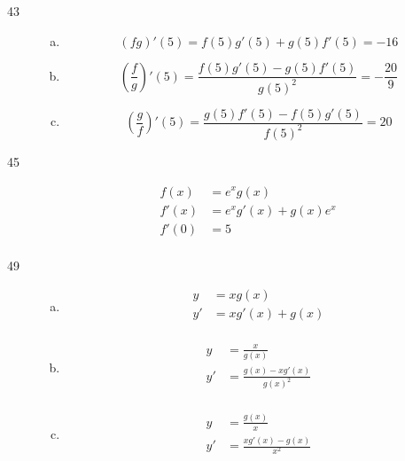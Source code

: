 \documentclass[letterpaper, landscape]{exam}
\begin{document}
\begin{description}
    \item[43]
      \begin{enumerate}[(a)]

        \item 
          \[
            (fg)'(5) = f(5)g'(5) + g(5)f'(5) = \boxed{ -16 }
          \]

        \item 
          \[
            (\frac{f}{g})'(5) = \frac{f(5)g'(5) - g(5)f'(5)}{g(5)^2} 
              = \boxed{ - \frac{20}{9} }
          \]

        \item 
          \[
            (\frac{g}{f})'(5) = \frac{g(5)f'(5) - f(5)g'(5)}{f(5)^2} = \boxed{ 20 }
          \]

      \end{enumerate}

    \item[45]
      \begin{align*}
        f(x)  & = e^x g(x) \\
        f'(x) & = e^x g'(x) + g(x) e^x \\
        f'(0) & = \boxed{ 5 } \\
      \end{align*}

    \item[49]
      \begin{enumerate}[(a)]

        \item 
          \begin{align*}
            y  & = x g(x) \\
            y' & = x g'(x) + g(x) \\
          \end{align*}

        \item 
          \begin{align*}
            y  & = \frac{x}{g(x)} \\
            y' & = \frac{g(x) - x g'(x)}{g(x)^2} \\
          \end{align*}

        \item 
          \begin{align*}
            y  & = \frac{g(x)}{x} \\
            y' & = \frac{x g'(x) - g(x)}{x^2} \\
          \end{align*}


\end{enumerate}
\end{description}
\end{document}
